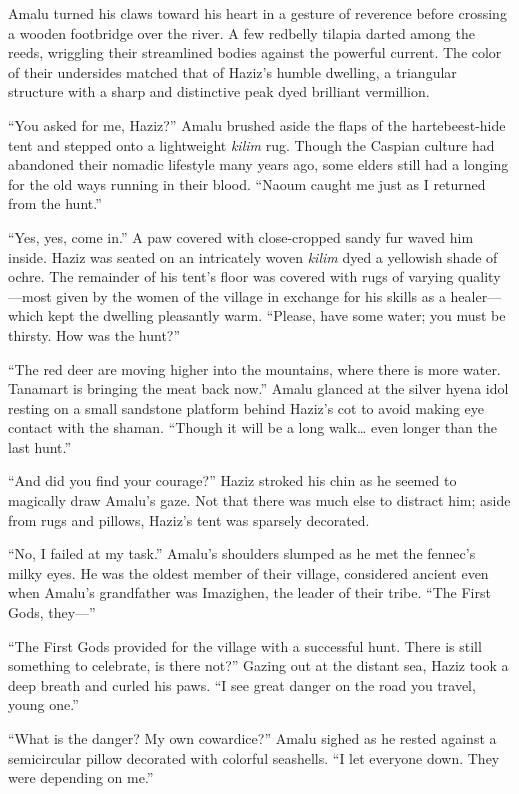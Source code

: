 Amalu turned his claws toward his heart in a gesture of reverence before crossing a wooden footbridge over the river. A few redbelly tilapia darted among the reeds, wriggling their streamlined bodies against the powerful current. The color of their undersides matched that of Haziz's humble dwelling, a triangular structure with a sharp and distinctive peak dyed brilliant vermillion.

``You asked for me, Haziz?'' Amalu brushed aside the flaps of the hartebeest-hide tent and stepped onto a lightweight \emph{kilim} rug. Though the Caspian culture had abandoned their nomadic lifestyle many years ago, some elders still had a longing for the old ways running in their blood. ``Naoum caught me just as I returned from the hunt.''

``Yes, yes, come in.'' A paw covered with close-cropped sandy fur waved him inside. Haziz was seated on an intricately woven \emph{kilim} dyed a yellowish shade of ochre. The remainder of his tent's floor was covered with rugs of varying quality---most given by the women of the village in exchange for his skills as a healer---which kept the dwelling pleasantly warm. ``Please, have some water; you must be thirsty. How was the hunt?''

``The red deer are moving higher into the mountains, where there is more water. Tanamart is bringing the meat back now.'' Amalu glanced at the silver hyena idol resting on a small sandstone platform behind Haziz's cot to avoid making eye contact with the shaman. ``Though it will be a long walk\ldots{} even longer than the last hunt.''

``And did you find your courage?'' Haziz stroked his chin as he seemed to magically draw Amalu's gaze. Not that there was much else to distract him; aside from rugs and pillows, Haziz's tent was sparsely decorated.

``No, I failed at my task.'' Amalu's shoulders slumped as he met the fennec's milky eyes. He was the oldest member of their village, considered ancient even when Amalu's grandfather was Imazighen, the leader of their tribe. ``The First Gods, they---''

``The First Gods provided for the village with a successful hunt. There is still something to celebrate, is there not?'' Gazing out at the distant sea, Haziz took a deep breath and curled his paws. ``I see great danger on the road you travel, young one.''

``What is the danger? My own cowardice?'' Amalu sighed as he rested against a semicircular pillow decorated with colorful seashells. ``I let everyone down. They were depending on me.''


